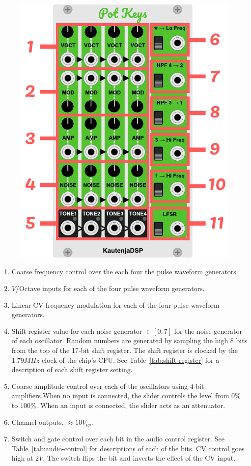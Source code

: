 \documentclass[12pt,letter]{article}
\begin{document}
\begin{figure}[!htp]
\centering
\includegraphics{Interface}
\end{figure}

\begin{enumerate}
  \item Coarse frequency control over the each four the pulse waveform generators.
  \item $V$/Octave inputs for each of the four pulse waveform generators.
  \item Linear CV frequency modulation for each of the four pulse waveform generators.
  \item Shift register value for each noise generator $\in [0, 7]$ for the noise generator of each oscillator. Random numbers are generated by sampling the high 8 bits from the top of the 17-bit shift register. The shift register is clocked by the $1.79MHz$ clock of the chip's CPU. See Table~\ref{tab:shift-register} for a description of each shift register setting.
  \item Coarse amplitude control over each of the oscillators using 4-bit amplifiers.When no input is connected, the slider controls the level from $0\%$ to $100\%$. When an input is connected, the slider acts as an attenuator.
  \item Channel outputs, ${\approx}10V_{pp}$.
  \item Switch and gate control over each bit in the audio control register. See Table~\ref{tab:audio-control} for descriptions of each of the bits. CV control goes high at $2V$. The switch flips the bit and inverts the effect of the CV input.
\end{enumerate}
\end{document}
